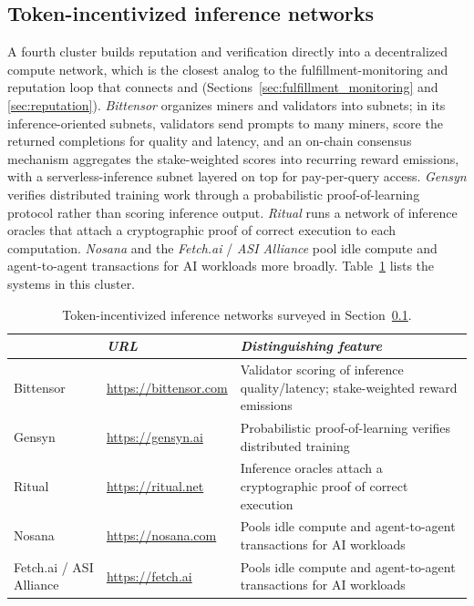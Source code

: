 \subsection{Token-incentivized inference networks}
\label{sec:sota_decentralized}

A fourth cluster builds reputation and verification directly into a
decentralized compute network, which is the closest analog to the
fulfillment-monitoring and reputation loop that connects \NoesisServer{}
and \NoesisMarket{} (Sections~\ref{sec:fulfillment_monitoring} and
\ref{sec:reputation}).
\emph{Bittensor} organizes miners and validators into subnets; in its
inference-oriented subnets, validators send prompts to many miners, score
the returned completions for quality and latency, and an on-chain
consensus mechanism aggregates the stake-weighted scores into recurring
reward emissions, with a serverless-inference subnet layered on top for
pay-per-query access. \emph{Gensyn} verifies distributed training work
through a probabilistic proof-of-learning protocol rather than scoring
inference output. \emph{Ritual} runs a network of inference oracles that
attach a cryptographic proof of correct execution to each computation.
\emph{Nosana} and the \emph{Fetch.ai} / \emph{ASI Alliance} pool idle
compute and agent-to-agent transactions for AI workloads more broadly.
Table~\ref{tab:sota_decentralized_companies} lists the systems in this
cluster.

\begin{samepage}
  \begin{table}[H]
    \centering
    \footnotesize
    \begin{tabular}{l|l|p{6.2cm}|}
                             & \emph{URL} & \emph{Distinguishing feature} \\
      \hline
      Bittensor               & \url{https://bittensor.com} & Validator scoring of inference quality/latency; stake-weighted reward emissions \\
      \hline
      Gensyn                  & \url{https://gensyn.ai} & Probabilistic proof-of-learning verifies distributed training \\
      \hline
      Ritual                  & \url{https://ritual.net} & Inference oracles attach a cryptographic proof of correct execution \\
      \hline
      Nosana                  & \url{https://nosana.com} & Pools idle compute and agent-to-agent transactions for AI workloads \\
      \hline
      Fetch.ai / ASI Alliance  & \url{https://fetch.ai} & Pools idle compute and agent-to-agent transactions for AI workloads \\
      \hline
    \end{tabular}
    \caption{Token-incentivized inference networks surveyed in
      Section~\ref{sec:sota_decentralized}.}
    \label{tab:sota_decentralized_companies}
  \end{table}
\end{samepage}

